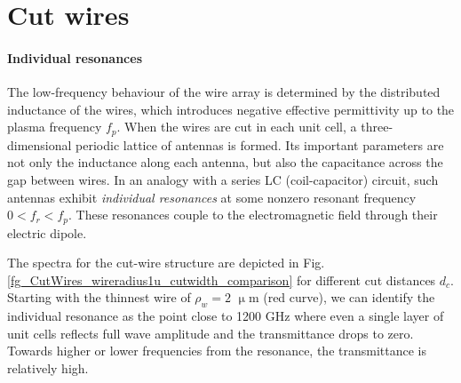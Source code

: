 

\FloatBarrier %
\section{Cut wires} \label{section_cutwires}
\paragraph{Individual resonances}%
The low-frequency behaviour of the wire array is determined by the distributed inductance of the wires, which introduces negative effective permittivity up to the plasma frequency $f_p$. When the wires are cut in each unit cell, a three-dimensional periodic lattice of antennas is formed. Its important parameters are not only the inductance along each antenna, but also the capacitance across the gap between wires. In an analogy with a series LC (coil-capacitor) circuit, such antennas exhibit \textit{individual resonances} at some nonzero resonant frequency $0<f_r<f_p$. These resonances couple to the electromagnetic field through their electric dipole.

The spectra for the cut-wire structure are depicted in Fig. \ref{fg_CutWires_wireradius1u_cutwidth_comparison} for different cut distances $d_c$. Starting with the thinnest wire of $\rho_w = 2$ $\upmu$m (red curve), we can identify the individual resonance as the point close to  1200 GHz where even a single layer of unit cells reflects full wave amplitude and the transmittance drops to zero. Towards higher or lower frequencies from the resonance, the transmittance is relatively high.

